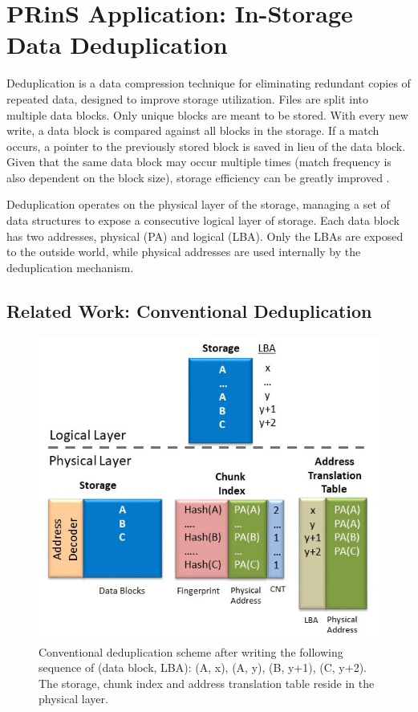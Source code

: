 \documentclass{superfri}
\begin{document}
\section{PRinS Application: In-Storage Data Deduplication}
\label{sec:dedup}
Deduplication is a data compression technique for eliminating redundant copies of repeated data, designed to improve storage utilization. Files are split into multiple data blocks. Only unique blocks are meant to be stored. With every new write, a data block is compared against all blocks in the storage. If a match occurs, a pointer to the previously stored block is saved in lieu of the data block. Given that the same data block may occur multiple times (match frequency is also dependent on the block size), storage efficiency can be greatly improved \cite{zhu2008avoiding}.

Deduplication operates on the physical layer of the storage, managing a set of data structures to expose a consecutive logical layer of storage. Each data block has two addresses, physical (PA) and logical (LBA). Only the LBAs are exposed to the outside world, while physical addresses are used internally by the deduplication mechanism.

\subsection{Related Work: Conventional Deduplication}

\begin{figure}[ht!]
	\centerline{\includegraphics[scale=0.6]{Figures/dedup_PC.jpg}}
	\caption{Conventional deduplication scheme after writing the following sequence of (data block, LBA): (A, x), (A, y), (B, y+1), (C, y+2). The storage, chunk index and address translation table reside in the physical layer.}
	\label{fig:dedup_PC}
\end{figure}
\end{document}
